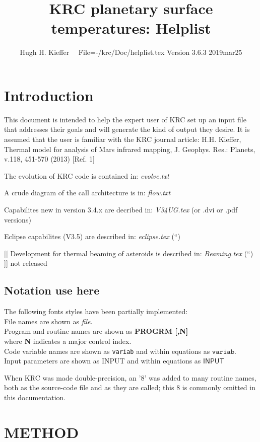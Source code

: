\documentclass{article}
\title{KRC planetary surface temperatures: Helplist}
\author{Hugh H. Kieffer \ \ File=-/krc/Doc/helplist.tex Version 3.6.3 2019mar25}
\newcommand{\qi}{\\ \hspace*{2.em}}      %
\newcommand{\qii}{\\ \hspace*{4.em}}     %
\newcommand{\np}{\textbf}  %
\newcommand{\nf}{\textit}  %
\newcommand{\nv}{\texttt}  %
\newcommand{\nvf}{\mathtt} %
\newcommand{\nj}{\textsf}  %
\newcommand{\njf}{\mathsf} %
\begin{document}
\maketitle

\tableofcontents
 \listoftables

\section{Introduction} %

This document is intended to help the expert user of KRC set up an input file
that addresses their goals and will generate the kind of output they desire. It
is assumed that the user is familiar with the KRC journal article: H.H. Kieffer,
Thermal model for analysis of Mars infrared mapping, J. Geophys. Res.: Planets,
v.118, 451-570 (2013) [Ref. 1]

The evolution of KRC code is contained in:  \nf{evolve.txt}

A crude diagram of the call architecture is in:  \nf{flow.txt}

Capabilites new in version 3.4.x are decribed in: \nf{V34UG.tex} (or .dvi or .pdf versions)

Eclipse capabilites (V3.5) are described in: \nf{eclipse.tex}  (``)

[[ Development for thermal beaming of asteroids is described in: \nf{Beaming.tex} (``) ]] not released

\subsection{Notation use here}
The following fonts styles have been partially implemented: 
\qi File names are shown as \nf{file}. 
\qi Program and routine names are shown as \np{PROGRM [,N]} 
\qii where \np{N} indicates a major control index. 
\qi Code variable names are shown as \nv{variab} and within equations as $\nvf{variab}$.  
\qi Input parameters are shown as \nj{INPUT} and within equations as $\njf{INPUT}$

When KRC was made double-precision, an '8' was added to many routine names, both
as the source-code file and as they are called; this 8 is commonly omitted in
this documentation.

\section{METHOD}
\end{document}
